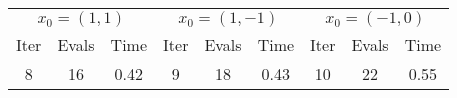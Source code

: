\begin{tabular}{ccc|ccc|ccc} \hline \hline 
\multicolumn{3}{c}{$x_0 = (1,1)$} & \multicolumn{3}{c}{$x_0 = (1,-1)$} & \multicolumn{3}{c}{$x_0 = (-1,0)$} \\ 
Iter & Evals & Time & Iter & Evals & Time & Iter & Evals & Time \\ \hline 
8 & 16 & 0.42 & 9 & 18 & 0.43 & 10 & 22 & 0.55 \\ 
\hline \hline 
\end{tabular} 

